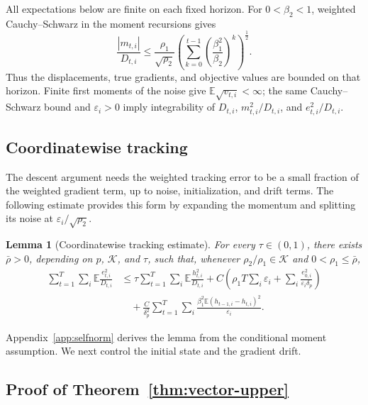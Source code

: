\documentclass[11pt,letterpaper]{article}
\newtheorem{lemma}[theorem]{Lemma}
\theoremstyle{definition}
\newcommand{\E}{\mathbb E}
\newcommand{\eps}{\varepsilon}
\begin{document}
All expectations below are finite on each fixed horizon. For
$0<\beta_2<1$, weighted Cauchy--Schwarz in the moment recursions gives
\[
\frac{|m_{t,i}|}{D_{t,i}}\le\frac{\rho_1}{\sqrt{\rho_2}}
\left(\sum_{k=0}^{t-1}\left(\frac{\beta_1^2}{\beta_2}\right)^k\right)^{\frac12}.
\]
Thus the displacements, true gradients, and objective values are bounded
on that horizon. Finite first moments of the noise give
$\E\sqrt{v_{t,i}}<\infty$; the same Cauchy--Schwarz bound and
$\eps_i>0$ imply integrability of $D_{t,i}$,
$m_{t,i}^2/D_{t,i}$, and $e_{t,i}^2/D_{t,i}$.

\subsection{Coordinatewise tracking}

The descent argument needs the weighted tracking error to be a small
fraction of the weighted gradient term, up to noise, initialization,
and drift terms. The following estimate provides this form by expanding
the momentum and splitting its noise at $\eps_i/\sqrt{\rho_2}$.

\begin{lemma}[Coordinatewise tracking estimate]
\label{lem:self-normalization}
For every $\tau\in(0,1)$, there exists $\bar\rho>0$, depending on
$p$, $\mathcal K$, and $\tau$, such that, whenever
$\rho_2/\rho_1\in\mathcal K$ and $0<\rho_1\le\bar\rho$,
\begin{align}
\sum_{t=1}^T\sum_i\E\frac{e_{t,i}^2}{D_{t,i}}
&\le
\tau\sum_{t=1}^T\sum_i\E\frac{h_{t,i}^2}{D_{t,i}}
+C\left(
\rho_1T\sum_i\eps_i+
\sum_i\frac{e_{0,i}^2}{\eps_i\delta_p}
\right)\nonumber\\
&\quad+
\frac{C}{\delta_p^2}
\sum_{t=1}^T\sum_i
\frac{\beta_1^2\E(h_{t-1,i}-h_{t,i})^2}{\eps_i}.
\label{eq:selfnorm-vector}
\end{align}
\end{lemma}

Appendix~\ref{app:selfnorm} derives the lemma from the conditional moment assumption. We next control the initial state and the gradient drift.

\subsection{Proof of Theorem~\ref{thm:vector-upper}}
\label{app:upper-proof}
\end{document}
